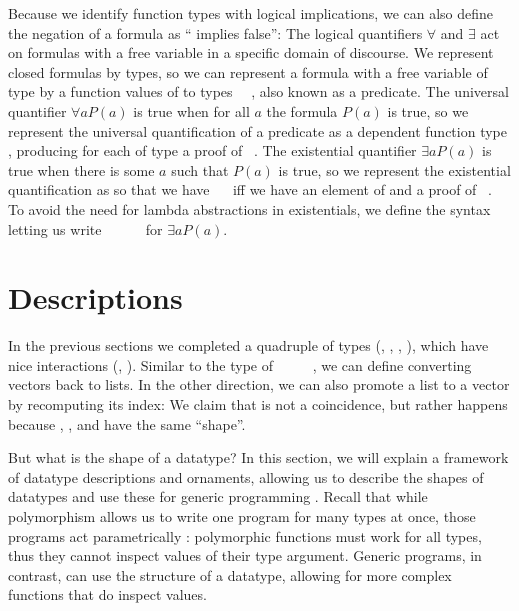Because we identify function types with logical implications, we can also define the negation of a formula  as `` implies false'':
The logical quantifiers $\forall$ and $\exists$ act on formulas with a free variable in a specific domain of discourse.
We represent closed formulas by types, so we can represent a formula with a free variable of type  by a function values of  to types \ \ , also known as a predicate. The universal quantifier $\forall a P(a)$ is true when for all $a$ the formula $P(a)$ is true, so we represent the universal quantification of a predicate  as a dependent function type , producing for each  of type  a proof of \ . The existential quantifier $\exists a P(a)$ is true when there is some $a$ such that $P(a)$ is true, so we represent the existential quantification as
so that we have \ \  iff we have an element  of  and a proof  of \ . To avoid the need for lambda abstractions in existentials, we define the syntax
letting us write \AD{Σ[}\ \ \ \ \AD{]}\  for $\exists a P(a)$.

\section{Descriptions}\label{sec:background-descriptions}
In the previous sections we completed a quadruple of types (\bN{}, , , ), 
which have nice interactions (, ). Similar to the type of \ \AV{:}\ \ \ \ \bN{}, we can define
converting vectors back to lists. In the other direction, we can also promote a list to a vector by recomputing its index:
We claim that is not a coincidence, but rather happens because \bN{}, , and  have the same ``shape''.

But what is the shape of a datatype? In this section, we will explain a framework of datatype descriptions and ornaments, allowing us to describe the shapes of datatypes and use these for generic programming \cite{ulftutorial, mcbride, others}. Recall that while polymorphism allows us to write one program for many types at once, those programs act parametrically \cite{reynolds, forfree}: polymorphic functions must work for all types, thus they cannot inspect values of their type argument. Generic programs, in contrast, can use the structure of a datatype, allowing for more complex functions that do inspect values.

